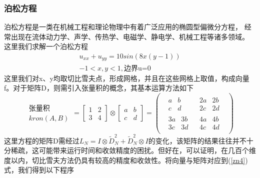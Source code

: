 \documentclass[12pt]{ctexart}
\numberwithin{equation}{section} %
\begin{document}
   \subsubsection{泊松方程}
   泊松方程是一类在机械工程和理论物理中有着广泛应用的椭圆型偏微分方程， 经常出现在流体动力学、声学、传热学、电磁学、静电学、机械工程等诸多领域。\\
   这里我们求解一个泊松方程
   \begin{equation}\label{zn12}
   \begin{split}
       u_{xx}+u_{yy}=10sin(8x(y-1))\\
    -1<x,y<1,\text{边界u=0}
   \end{split}
   \end{equation}
   这里我们对x、y均取切比雪夫点，形成网格，并且在这些网格上取值，构成向量f。对于矩阵D，则需引入张量积的概念，其基本运算方法如下
   $$\begin{matrix}
    \text{张量积}\\
    kron(A,B)
\end{matrix}=
\begin{bmatrix}
    1&2\\
    3&4
\end{bmatrix}
\otimes 
\begin{bmatrix}
    a&b\\
    c&d
\end{bmatrix}=\begin{pmatrix}
    \begin{array}{c|c}
    \begin{array}{cc}
       a & b \\
       c & d
    \end{array} &
    \begin{array}{cc}
       2a & 2b \\
       2c & 2d
    \end{array} \\
    \hline
    \begin{array}{cc}
       3a & 3b \\
       3c & 3d
    \end{array} &
    \begin{array}{cc}
       4a & 4b \\
       4c & 4d
    \end{array}
\end{array}
\end{pmatrix}$$
这里方程的矩阵D\cite{shen2011spectral}\cite{trefethen2000spectral}需经过$L_N=I\otimes\widetilde{D}^2_N+\widetilde{D}^2_N\otimes I$的变化，该矩阵的结果往往并不十分稀疏，这可能带来运行时间和收敛精度的困扰。但好在，可以证明，在几百个维度以内，切比雪夫方法仍具有较高的精度和收敛性。将向量与矩阵对应到(\ref{zn4})式，我们得到以下程序\\
\end{document}
